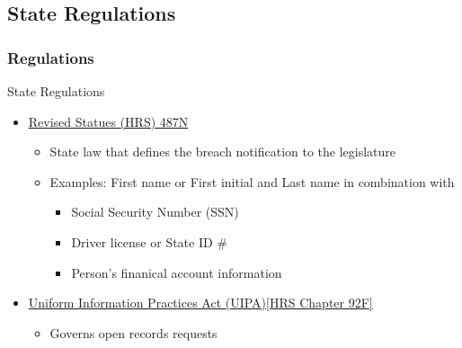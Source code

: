 \subsection{State Regulations}
\begin{frame}
  \frametitle{Regulations}
  \vspace{-5pt}
  \begin{block}{State Regulations}
    \begin{itemize}
    \item \href{https://www.capitol.hawaii.gov/hrscurrent/Vol11_Ch0476-0490/HRS0487N/HRS_0487N-.htm}{{\hawaii} Revised Statues (HRS) 487N}
      \begin{itemize}
      \item State law that defines the breach notification to the legislature
      \item Examples: First name or First initial and Last name in combination with
        \begin{itemize}
        \item Social Security Number (SSN)
        \item Driver license or State ID \#
        \item Person's finanical account information
          \end{itemize}
      \end{itemize}
    
    \item \href{https://www.capitol.hawaii.gov/hrscurrent/Vol02_Ch0046-0115/HRS0092F/HRS_0092F-.htm}{Uniform Information Practices Act (UIPA)[HRS Chapter 92F]}
      \begin{itemize}
      \item Governs open records requests
      \end{itemize}
    \end{itemize}
\end{block}
\end{frame}  




